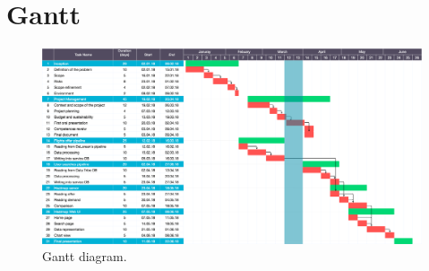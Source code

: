 
\section{Gantt}

\begin{figure}[H]
\centering
\includegraphics[scale=0.15,  angle =90]{diagrams/gantt.png}
\caption{Gantt diagram.}
\end{figure}



